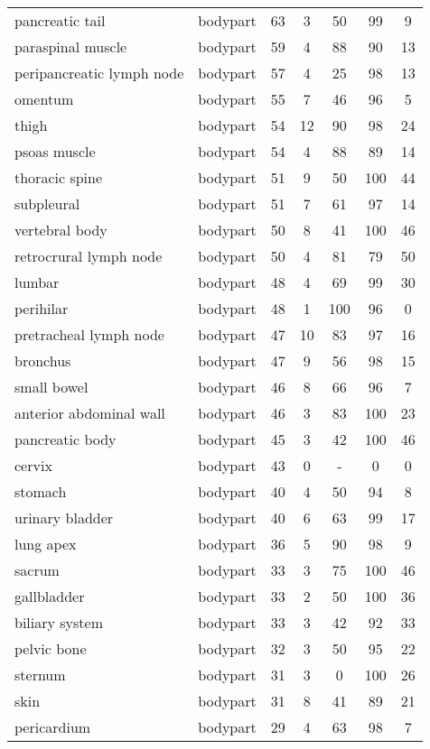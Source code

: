 \documentclass[runningheads]{llncs}
\begin{document}
\begin{table}[]
\begin{tabular}{p{3.6cm}cccccc}
		pancreatic tail	&  bodypart	& 63	& 3	& 50	& 99	& 9 \\
		paraspinal muscle	&  bodypart	& 59	& 4	& 88	& 90	& 13 \\
		peripancreatic lymph node	&  bodypart	& 57	& 4	& 25	& 98	& 13 \\
		omentum	&  bodypart	& 55	& 7	& 46	& 96	& 5 \\
		thigh	&  bodypart	& 54	& 12	& 90	& 98	& 24 \\
		psoas muscle	&  bodypart	& 54	& 4	& 88	& 89	& 14 \\
		thoracic spine	&  bodypart	& 51	& 9	& 50	& 100	& 44 \\
		subpleural	&  bodypart	& 51	& 7	& 61	& 97	& 14 \\
		vertebral body	&  bodypart	& 50	& 8	& 41	& 100	& 46 \\
		retrocrural lymph node	&  bodypart	& 50	& 4	& 81	& 79	& 50 \\
		lumbar	&  bodypart	& 48	& 4	& 69	& 99	& 30 \\
		perihilar	&  bodypart	& 48	& 1	& 100	& 96	& 0 \\
		pretracheal lymph node	&  bodypart	& 47	& 10	& 83	& 97	& 16 \\
		bronchus	&  bodypart	& 47	& 9	& 56	& 98	& 15 \\
		small bowel	&  bodypart	& 46	& 8	& 66	& 96	& 7 \\
		anterior abdominal wall	&  bodypart	& 46	& 3	& 83	& 100	& 23 \\
		pancreatic body	&  bodypart	& 45	& 3	& 42	& 100	& 46 \\
		cervix	&  bodypart	& 43	& 0	&-	& 0	& 0 \\
		stomach	&  bodypart	& 40	& 4	& 50	& 94	& 8 \\
		urinary bladder	&  bodypart	& 40	& 6	& 63	& 99	& 17 \\
		lung apex	&  bodypart	& 36	& 5	& 90	& 98	& 9 \\
		sacrum	&  bodypart	& 33	& 3	& 75	& 100	& 46 \\
		gallbladder	&  bodypart	& 33	& 2	& 50	& 100	& 36 \\
		biliary system	&  bodypart	& 33	& 3	& 42	& 92	& 33 \\
		pelvic bone	&  bodypart	& 32	& 3	& 50	& 95	& 22 \\
		sternum	&  bodypart	& 31	& 3	& 0	& 100	& 26 \\
		skin	&  bodypart	& 31	& 8	& 41	& 89	& 21 \\
		pericardium	&  bodypart	& 29	& 4	& 63	& 98	& 7 \\

\end{tabular}
\end{table}
\end{document}
